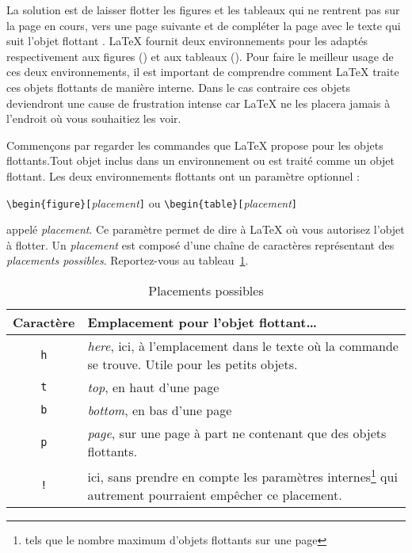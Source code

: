 La solution est de laisser \og flotter \fg{} les figures et les tableaux
qui ne rentrent pas sur la page en cours, vers une page suivante et de
compléter la page avec le texte qui suit l'objet \og flottant \fg{}.
\LaTeX{} fournit deux
environnements pour les  adaptés respectivement
aux figures () et aux tableaux (). Pour
faire le meilleur usage de ces deux environnements, il est important
de comprendre comment \LaTeX{} traite ces objets flottants de manière
interne. Dans le cas contraire ces objets deviendront une cause de
frustration intense
car \LaTeX{} ne les placera jamais à l'endroit où vous souhaitiez les
voir.

\bigskip
Commençons par regarder les commandes que \LaTeX{} propose pour les
objets flottants.Tout objet inclus dans un environnement 
ou  est traité comme un objet flottant. Les deux
environnements flottants ont un paramètre optionnel :
\begin{lscommand}
\verb|\begin{figure}[|\emph{placement}\verb|]| ou
\verb|\begin{table}[|\emph{placement}\verb|]|
\end{lscommand}
\noindent
appelé \emph{placement}. Ce paramètre permet de dire à \LaTeX{} où
vous autorisez l'objet à flotter. Un \emph{placement} est composé
d'une chaîne de caractères représentant des \emph{placements
possibles}. Reportez-vous au tableau~\ref{tab:permiss}.


\begin{table}[!htbp]
\caption{Placements possibles}\label{tab:permiss}
\noindent \begin{minipage}{\textwidth}
\medskip
\begin{center}
\begin{tabular}{@{}cp{8cm}@{}}
Caractère & Emplacement pour l'objet flottant\dots\\
\hline
\rule{0pt}{1.05em}%
\texttt{h} & \emph{here}, ici, à l'emplacement dans
	     le texte où la commande se trouve. Utile pour les petits
	     objets.\\[0.3ex]
\texttt{t} & \emph{top}, en haut d'une page\\[0.3ex]
\texttt{b} & \emph{bottom}, en bas d'une page\\[0.3ex]
\texttt{p} & \emph{page}, sur une page à part ne contenant que des
             objets flottants.\\[0.3ex]
\texttt{!} & ici, sans prendre en compte les paramètres
             internes\footnote{tels que le nombre maximum d'objets
             flottants sur une page} qui autrement pourraient empêcher ce
             placement.
\end{tabular}
\end{center}
\end{minipage}
\end{table}

